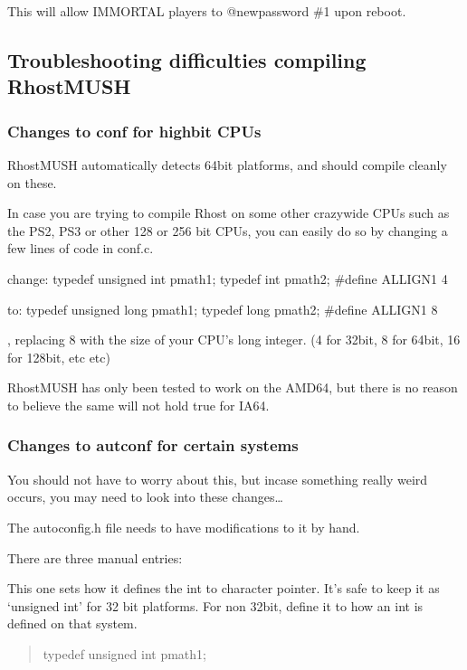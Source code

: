 \documentclass[letterpaper,10pt,english]{sphinxmanual}
\begin{document}
\sphinxAtStartPar
This will allow IMMORTAL players to @newpassword \#1 upon reboot.


\subsection{Troubleshooting difficulties compiling RhostMUSH}
\label{\detokenize{troubleshooting:troubleshooting-difficulties-compiling-rhostmush}}

\subsubsection{Changes to conf for high\sphinxhyphen{}bit CPUs}
\label{\detokenize{troubleshooting:changes-to-conf-for-high-bit-cpus}}
\sphinxAtStartPar
RhostMUSH automatically detects 64\sphinxhyphen{}bit platforms, and should compile
cleanly on these.

\sphinxAtStartPar
In case you are trying to compile Rhost on some other crazy\sphinxhyphen{}wide CPUs
such as the PS2, PS3 or other 128 or 256 bit CPUs, you can easily do
so by changing a few lines of code in conf.c.

\sphinxAtStartPar
change:
typedef unsigned int    pmath1;
typedef int             pmath2;
\#define ALLIGN1 4

\sphinxAtStartPar
to:
typedef unsigned long   pmath1;
typedef long            pmath2;
\#define ALLIGN1 8

\sphinxAtStartPar
, replacing 8 with the size of your CPU’s long integer. (4 for 32\sphinxhyphen{}bit,
8 for 64\sphinxhyphen{}bit, 16 for 128\sphinxhyphen{}bit, etc etc)

\sphinxAtStartPar
RhostMUSH has only been tested to work on the AMD64, but there is no
reason to believe the same will not hold true for IA64.


\subsubsection{Changes to autconf for certain systems}
\label{\detokenize{troubleshooting:changes-to-autconf-for-certain-systems}}
\sphinxAtStartPar
You should not have to worry about this, but incase something really
weird occurs, you may need to look into these changes…

\sphinxAtStartPar
The autoconfig.h file needs to have modifications to it by hand.

\sphinxAtStartPar
There are three manual entries:

\sphinxAtStartPar
This one sets how it defines the int to character pointer.  It’s safe
to keep it as ‘unsigned int’ for 32 bit platforms.  For non 32\sphinxhyphen{}bit,
define it to  how an int is defined on that system.
\begin{quote}

\sphinxAtStartPar
typedef unsigned int    pmath1;
\end{quote}
\end{document}

